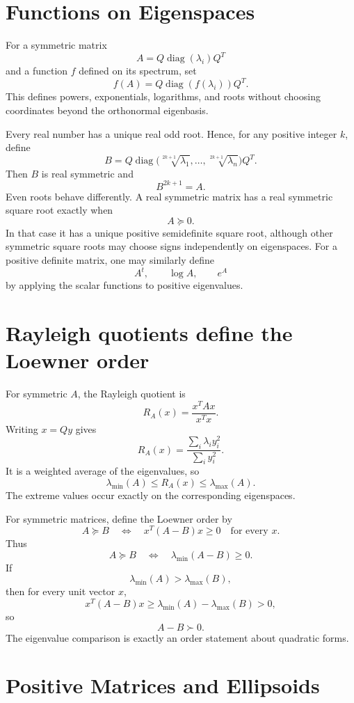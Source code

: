 \section{Functions on Eigenspaces}

For a symmetric matrix
\[
  A=Q\operatorname{diag}(\lambda_i)Q^T
\]
and a function \(f\) defined on its spectrum, set
\[
  f(A)=Q\operatorname{diag}(f(\lambda_i))Q^T.
\]
This defines powers, exponentials, logarithms, and roots without choosing coordinates beyond the orthonormal eigenbasis.

Every real number has a unique real odd root.  Hence, for any positive integer \(k\), define
\[
  B=Q\operatorname{diag}
  \bigl(\sqrt[2k+1]{\lambda_1},\ldots,
        \sqrt[2k+1]{\lambda_n}\bigr)Q^T.
\]
Then \(B\) is real symmetric and
\[
  B^{2k+1}=A.
\]
Even roots behave differently.  A real symmetric matrix has a real symmetric square root exactly when
\[
  A\succeq0.
\]
In that case it has a unique positive semidefinite square root, although other symmetric square roots may choose signs independently on eigenspaces.
For a positive definite matrix, one may similarly define
\[
  A^t,
  \qquad
  \log A,
  \qquad
  e^A
\]
by applying the scalar functions to positive eigenvalues.

\section{Rayleigh quotients define the Loewner order}

For symmetric \(A\), the Rayleigh quotient is
\[
  R_A(x)=\frac{x^TAx}{x^Tx}.
\]
Writing \(x=Qy\) gives
\[
  R_A(x)
  =\frac{\sum_i\lambda_i y_i^2}{\sum_i y_i^2}.
\]
It is a weighted average of the eigenvalues, so
\[
  \lambda_{\min}(A)
  \le R_A(x)
  \le\lambda_{\max}(A).
\]
The extreme values occur exactly on the corresponding eigenspaces.

For symmetric matrices, define the Loewner order by
\[
  A\succeq B
  \quad\Longleftrightarrow\quad
  x^T(A-B)x\ge0
  \quad\text{for every }x.
\]
Thus
\[
  A\succeq B
  \quad\Longleftrightarrow\quad
  \lambda_{\min}(A-B)\ge0.
\]
If
\[
  \lambda_{\min}(A)>\lambda_{\max}(B),
\]
then for every unit vector \(x\),
\[
  x^T(A-B)x
  \ge\lambda_{\min}(A)-\lambda_{\max}(B)>0,
\]
so
\[
  A-B\succ0.
\]
The eigenvalue comparison is exactly an order statement about quadratic forms.

\section{Positive Matrices and Ellipsoids}

